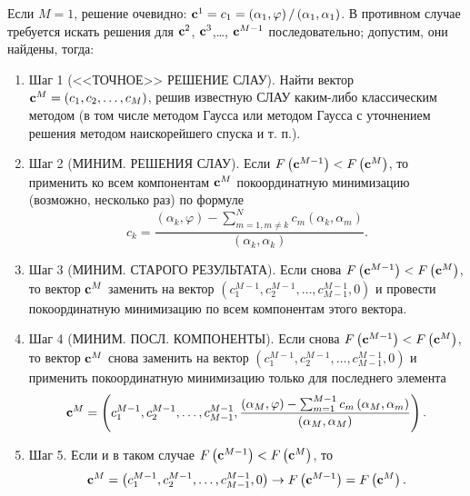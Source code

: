 \documentclass[a4paper, 12pt]{article}
\begin{document}
Если $M=1$, решение очевидно: ${\bf c}^1=c_1=\left({\alpha }_1,\varphi \right)/\left({\alpha }_1,{\alpha }_1\right)$. В противном случае требуется искать решения для ${\bf c}^2$, ${\bf c}^3$,{\dots}, ${\bf c}^{M-1}$ последовательно; допустим, они найдены, тогда:
\begin{enumerate}
 \item  Шаг 1 (<<ТОЧНОЕ>> РЕШЕНИЕ СЛАУ).
Найти вектор ${\bf c}^M=\left(c_1,c_2,\dots ,c_M\right)$, решив известную СЛАУ каким-либо классическим методом (в том числе методом Гаусса или методом Гаусса с уточнением решения методом наискорейшего спуска и т. п.).

\item  Шаг 2 (МИНИМ. РЕШЕНИЯ СЛАУ). Если $F\left({\bf c}^{M-1}\right)<F\left({\bf c}^M\right)$, то применить ко всем компонентам ${\bf c}^M$ покоординатную минимизацию (возможно, несколько раз) по формуле
\begin{equation}
  c_k=\frac{\left({\alpha }_k,\varphi \right)-\sum^N_{m=1,m\neq k}{c_m}\left({\alpha }_k,{\alpha }_m\right)}{\left({\alpha }_k,{\alpha }_k\right)}.
\end{equation}

\item   Шаг 3 (МИНИМ. СТАРОГО РЕЗУЛЬТАТА). Если снова $F\left({\bf c}^{M-1}\right)<F\left({\bf c}^M\right)$, то вектор ${\bf c}^M$ заменить на вектор $\left(c^{M-1}_1,c^{M-1}_2,\dots ,c^{M-1}_{M-1},0\right)$ и провести покоординатную минимизацию по всем компонентам этого вектора.

\item  Шаг 4 (МИНИМ. ПОСЛ. КОМПОНЕНТЫ). Если снова $F\left({\bf c}^{M-1}\right)<F\left({\bf c}^M\right)$, то вектор ${\bf c}^M$ снова заменить на вектор $\left(c^{M-1}_1,c^{M-1}_2,\dots ,c^{M-1}_{M-1},0\right)$ и применить покоординатную минимизацию только для последнего элемента
\begin{equation}{\bf c}^M=\left(c^{M-1}_1,c^{M-1}_2,\dots ,c^{M-1}_{M-1},\frac{\left({\alpha }_M,\varphi \right)-\sum^{M-1}_{m=1}{c_m}\left({\alpha }_M,{\alpha }_m\right)}{\left({\alpha }_M,{\alpha }_M\right)}\right).\end{equation} 

\item  Шаг 5. Если и в таком случае $F\left({\bf c}^{M-1}\right)<F\left({\bf c}^M\right)$, то 
\begin{equation}{\bf c}^M=\left(c^{M-1}_1,c^{M-1}_2,\dots ,c^{M-1}_{M-1},0\right)\to F\left({\bf c}^{M-1}\right)=F\left({\bf c}^M\right).\end{equation} 

\end{enumerate}
\end{document}
